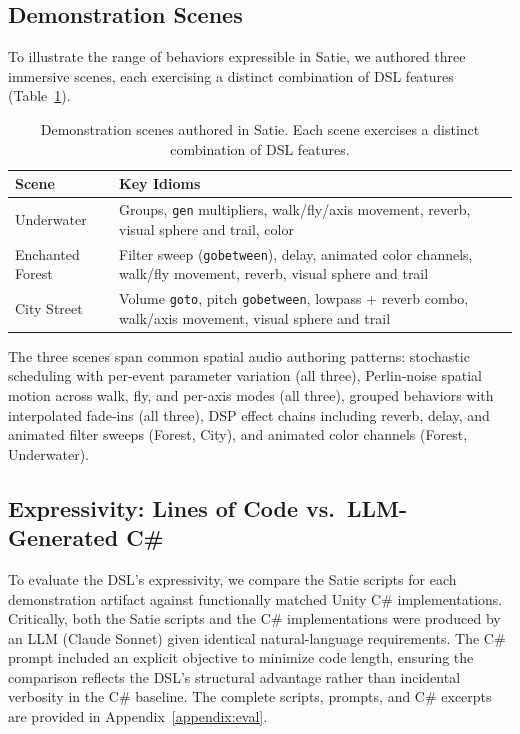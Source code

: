 \documentclass[sigconf,anonymous,review]{nimeart}
\begin{document}
\subsection{Demonstration Scenes}

To illustrate the range of behaviors expressible in Satie, we authored three immersive scenes, each exercising a distinct combination of DSL features (Table~\ref{tab:demos}).

\begin{table}[htbp]
\caption{Demonstration scenes authored in Satie. Each scene exercises a distinct combination of DSL features.}
\label{tab:demos}
\begin{tabular}{lp{5.5cm}}
\toprule
\textbf{Scene} & \textbf{Key Idioms} \\
\midrule
Underwater & Groups, \texttt{gen} multipliers, walk/fly/axis movement, reverb, visual sphere and trail, color \\
Enchanted Forest & Filter sweep (\texttt{gobetween}), delay, animated color channels, walk/fly movement, reverb, visual sphere and trail \\
City Street & Volume \texttt{goto}, pitch \texttt{gobetween}, lowpass + reverb combo, walk/axis movement, visual sphere and trail \\
\bottomrule
\end{tabular}
\end{table}

The three scenes span common spatial audio authoring patterns: stochastic scheduling with per-event parameter variation (all three), Perlin-noise spatial motion across walk, fly, and per-axis modes (all three), grouped behaviors with interpolated fade-ins (all three), DSP effect chains including reverb, delay, and animated filter sweeps (Forest, City), and animated color channels (Forest, Underwater).

\subsection{Expressivity: Lines of Code vs.\ LLM-Generated C\#}

To evaluate the DSL's expressivity, we compare the Satie scripts for each demonstration artifact against functionally matched Unity C\# implementations. Critically, both the Satie scripts and the C\# implementations were produced by an LLM (Claude Sonnet) given identical natural-language requirements. The C\# prompt included an explicit objective to minimize code length, ensuring the comparison reflects the DSL's structural advantage rather than incidental verbosity in the C\# baseline. The complete scripts, prompts, and C\# excerpts are provided in Appendix~\ref{appendix:eval}.
\end{document}
